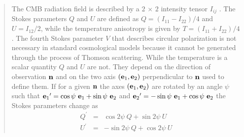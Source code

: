 \documentclass[12pt,twoside]{article}
\newcommand{\myhtmlimage}[1]{ }
\begin{document}
\begin{quotation}
\footnotesize
The CMB radiation field is described by a $2\, \times \, 2$ 
intensity tensor
$I_{ij}$
\citep{chandra}. The Stokes parameters $Q$ and $U$ are defined as 
$Q=(I_{11}-I_{22})/4$ and $U=I_{12}/2$, while the temperature anisotropy 
is given by $T=(I_{11}+I_{22})/4$. The fourth Stokes parameter $V$ that
describes circular polarization is not necessary in standard cosmological 
models because it cannot be generated through the process of Thomson 
scattering. While the temperature is a scalar quantity $Q$ and $U$ are
not. They depend on the direction of observation $\textbf{n}$
and on the two axis $(\textbf{e}_{1}, \textbf{e}_{2})$ 
perpendicular to $\textbf{n}$ used to define them. If for a given 
$\textbf{n}$ the axes $(\textbf{e}_{1}, \textbf{e}_{2})$ are rotated by an angle
$\psi$ such that 
${\veceo}^{\prime}=\cos \psi \ {\veceo}+\sin\psi \ {\vecet}\myhtmlimage{}$ 
and ${\vecet}^{\prime}=-\sin \psi \ {\veceo}+\cos\psi \ {\vecet}\myhtmlimage{}$
the Stokes parameters change as
\begin{eqnarray}
  Q^{\prime} &=& \cos 2\psi \  Q + \sin 2\psi \ U \nonumber \myhtmlimage{} \\  
  U^{\prime} &=& -\sin 2\psi \ Q + \cos 2\psi \ U     \myhtmlimage{}  \label{QUtrans} 
\end{eqnarray}


\end{quotation}
\end{document}
